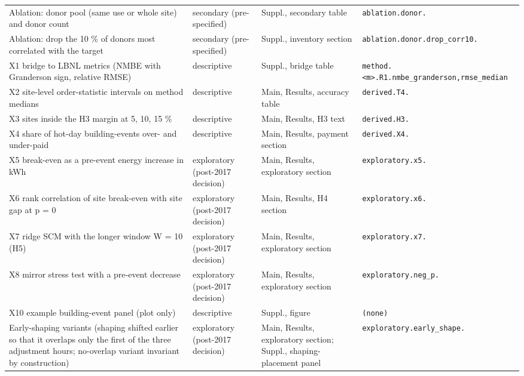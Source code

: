 {\begin{longtable}{@{}>{\raggedright\arraybackslash}p{}>{\raggedright\arraybackslash}p{}>{\raggedright\arraybackslash}p{}>{\raggedright\arraybackslash}p{}@{}}
Ablation: donor pool (same use or whole site) and donor count & secondary (pre-specified) & Suppl., secondary table & \texttt{ablation.\allowbreak donor.\allowbreak {*}} \\
Ablation: drop the 10 \% of donors most correlated with the target & secondary (pre-specified) & Suppl., inventory section & \texttt{ablation.\allowbreak donor.\allowbreak drop\_corr10.\allowbreak {*}} \\
X1 bridge to LBNL metrics (NMBE with Granderson sign, relative RMSE) & descriptive & Suppl., bridge table & \texttt{method.\allowbreak \textless{}m\textgreater{}.\allowbreak R1.\allowbreak nmbe\_granderson,\allowbreak  rmse\_median} \\
X2 site-level order-statistic intervals on method medians & descriptive & Main, Results, accuracy table & \texttt{derived.\allowbreak T4.\allowbreak {*}} \\
X3 sites inside the H3 margin at 5, 10, 15 \% & descriptive & Main, Results, H3 text & \texttt{derived.\allowbreak H3.\allowbreak {*}} \\
X4 share of hot-day building-events over- and under-paid & descriptive & Main, Results, payment section & \texttt{derived.\allowbreak X4.\allowbreak {*}} \\
X5 break-even as a pre-event energy increase in kWh & exploratory (post-2017 decision) & Main, Results, exploratory section & \texttt{exploratory.\allowbreak x5.\allowbreak {*}} \\
X6 rank correlation of site break-even with site gap at p = 0 & exploratory (post-2017 decision) & Main, Results, H4 section & \texttt{exploratory.\allowbreak x6.\allowbreak {*}} \\
X7 ridge SCM with the longer window W = 10 (H5) & exploratory (post-2017 decision) & Main, Results, exploratory section & \texttt{exploratory.\allowbreak x7.\allowbreak {*}} \\
X8 mirror stress test with a pre-event decrease & exploratory (post-2017 decision) & Main, Results, exploratory section & \texttt{exploratory.\allowbreak neg\_p.\allowbreak {*}} \\
X10 example building-event panel (plot only) & descriptive & Suppl., figure & \texttt{(none)} \\
Early-shaping variants (shaping shifted earlier so that it overlaps only the first of the three adjustment hours; no-overlap variant invariant by construction) & exploratory (post-2017 decision) & Main, Results, exploratory section; Suppl., shaping-placement panel & \texttt{exploratory.\allowbreak early\_shape.\allowbreak {*}} \\

\end{longtable}}
